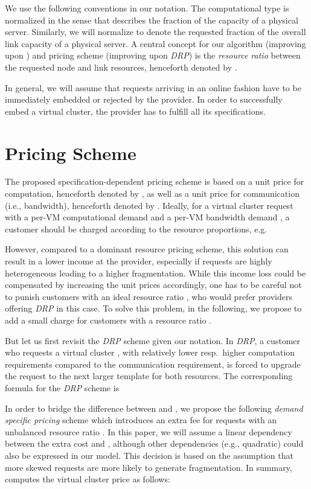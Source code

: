 \documentclass{sig-alternate-per}
\begin{document}
We use the following conventions in our notation. The computational type  is normalized in the sense that 
describes the fraction of the capacity of a physical server. Similarly, we will normalize
 to denote the requested fraction of the overall link capacity of a physical server.
A central concept for our algorithm  (improving upon ) and pricing scheme  (improving upon \emph{DRP}) is the \emph{resource ratio} between
the requested node and link resources, henceforth denoted by .

In general, we will assume that requests arriving in an online fashion have to be immediately embedded or rejected by the
provider. In order to successfully embed a virtual cluster, the provider has to fulfill all its specifications.

\section{Pricing Scheme}\label{sec:pricing}

The proposed specification-dependent pricing scheme  is based
on a unit price for computation, henceforth denoted by , as well as a unit price
for communication (i.e., bandwidth), henceforth denoted by .
Ideally, for a virtual cluster request with a per-VM computational demand 
and a per-VM bandwidth demand , a customer should be charged according to the resource
proportions, e.g.


However, compared to a dominant resource pricing scheme,
this solution can result in a lower income at the provider,
especially if requests are highly heterogeneous leading to a higher fragmentation.
While this income loss could be compensated by increasing
the unit prices 
accordingly, one has to be careful not to punish customers with an ideal resource ratio ,
who would prefer providers offering \emph{DRP} in this case.
To solve this problem, in the following, we propose to add a small charge for customers with a resource ratio .

But let us first revisit the \emph{DRP} scheme given our notation.
In \emph{DRP}, a customer who requests a virtual cluster , with relatively lower resp.~higher computation
requirements compared to the communication requirement, is forced to upgrade the request to the next larger
template for both resources.
The corresponding formula for the \emph{DRP} scheme is


In order to bridge the difference between  and ,
we propose the following
\emph{demand specific pricing} scheme
 which introduces an extra fee for requests with an unbalanced resource ratio .
In this paper, we will assume a linear dependency between the extra cost and , although other dependencies (e.g.,
quadratic) could
also be expressed in our model. This decision is based on the assumption that more skewed requests are more likely to
generate fragmentation. In summary,  computes the virtual cluster price as follows:
 
\end{document}

